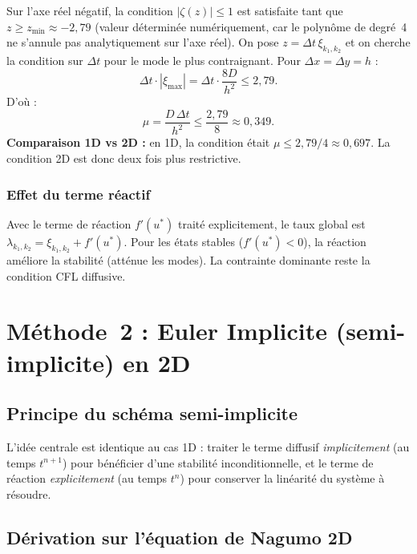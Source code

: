\documentclass[11pt,a4paper]{report}
\begin{document}
Sur l'axe r\'eel n\'egatif, la condition $|\zeta(z)|\le 1$ est satisfaite tant que
$z\ge z_{\min}\approx -2{,}79$ (valeur d\'etermin\'ee num\'eriquement, car le polyn\^ome
de degr\'e~4 ne s'annule pas analytiquement sur l'axe r\'eel).
On pose $z=\Delta t\,\xi_{k_1,k_2}$ et on cherche la condition sur $\Delta t$
pour le mode le plus contraignant. Pour $\Delta x=\Delta y=h$ :
\begin{equation}
  \Delta t\cdot|\xi_{\max}| = \Delta t\cdot\frac{8D}{h^2} \le 2{,}79.
\end{equation}
D'o\`u :
\begin{equation}
  \boxed{\mu = \frac{D\,\Delta t}{h^2} \le \frac{2{,}79}{8} \approx 0{,}349.}
\end{equation}
\textbf{Comparaison 1D vs 2D :} en 1D, la condition \'etait $\mu\le 2{,}79/4\approx 0{,}697$.
La condition 2D est donc deux fois plus restrictive.

\subsubsection*{Effet du terme r\'eactif}

Avec le terme de r\'eaction $f'(u^*)$ trait\'e explicitement, le taux global est
$\lambda_{k_1,k_2}=\xi_{k_1,k_2}+f'(u^*)$. Pour les \'etats stables ($f'(u^*)<0$),
la r\'eaction am\'eliore la stabilit\'e (att\'enue les modes). La contrainte dominante
reste la condition CFL diffusive.

\section{M\'ethode~2 : Euler Implicite (semi-implicite) en 2D}

\subsection*{Principe du sch\'ema semi-implicite}

L'id\'ee centrale est identique au cas 1D : traiter le terme diffusif \emph{implicitement}
(au temps $t^{n+1}$) pour b\'en\'eficier d'une stabilit\'e inconditionnelle, et le terme
de r\'eaction \emph{explicitement} (au temps $t^n$) pour conserver la lin\'earit\'e du
syst\`eme \`a r\'esoudre.

\subsection*{D\'erivation sur l'\'equation de Nagumo 2D}
\end{document}
